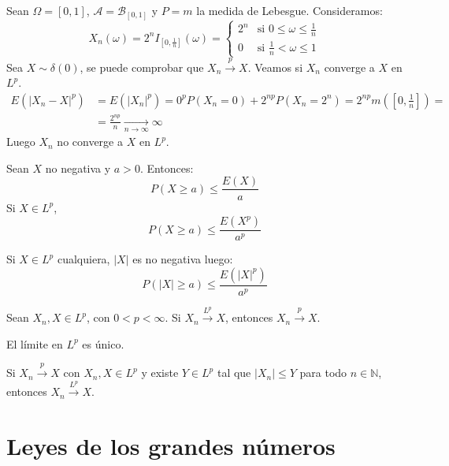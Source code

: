 \begin{example}
    Sean $\Omega = [0, 1]$, $\mathcal{A} = \mathcal{B}_{[0, 1]}$ y $P = m$ la medida de Lebesgue.
    Consideramos:
    $$X_n(\omega) = 2^n I_{[0, \frac{1}{n}]}(\omega) = \begin{cases}
            2^n & \text{si } 0 \leq \omega \leq \frac{1}{n} \\
            0   & \text{si } \frac{1}{n} < \omega \leq 1
        \end{cases}$$
    Sea $X \sim \delta(0)$, se puede comprobar que $X_n \xrightarrow{p} X$.
    Veamos si $X_n$ converge a $X$ en $L^p$.
    \begin{align*}
        E(|X_n - X|^p) & = E(|X_n|^p) = 0^pP(X_n = 0) + 2^{np}P(X_n = 2^n) = 2^{np}m\left(\left[0, \frac{1}{n}\right]\right) = \\
                       & = \frac{2^{np}}{n} \xrightarrow[n \to \infty]{} \infty
    \end{align*}
    Luego $X_n$ no converge a $X$ en $L^p$.
\end{example}

\begin{proposition}
    Sean $X$ no negativa y $a > 0$.
    Entonces:
    $$P(X \geq a) \leq \frac{E(X)}{a}$$
    Si $X \in L^p$,
    $$P(X \geq a) \leq \frac{E(X^p)}{a^p}$$
\end{proposition}

\begin{remark}
    Si $X \in L^p$ cualquiera, $|X|$ es no negativa luego:
    $$P(|X| \geq a) \leq \frac{E(|X|^p)}{a^p}$$
\end{remark}

\begin{theorem}
    Sean $X_n, X \in L^p$, con $0 < p < \infty$.
    Si $X_n \xrightarrow{L^p} X$, entonces $X_n \xrightarrow{p} X$.
\end{theorem}

\begin{theorem}
    El límite en $L^p$ es único.
\end{theorem}

\begin{theorem}
    Si $X_n \xrightarrow{p} X$ con $X_n, X \in L^p$ y existe $Y \in L^p$ tal que $|X_n| \leq Y$ para todo $n \in \mathbb{N}$, entonces $X_n \xrightarrow{L^p} X$.
\end{theorem}

\section{Leyes de los grandes números}
